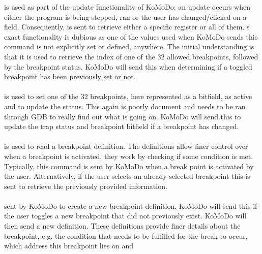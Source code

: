 %
 is used as part of the update functionality of KoMoDo; an update occurs when either the program is being stepped, ran or the user has changed/clicked on a field. Consequently,  is sent to retrieve either a specific register or all of them.
%
%
%
%
s exact functionality is dubious as one of the values used when KoMoDo sends this command is not explicitly set or defined, anywhere. The initial understanding is that it is used to retrieve the index of one of the 32 allowed breakpoints, followed by the breakpoint status. KoMoDo will send this when determining if a toggled breakpoint has been previously set or not.\\\\
%
 is used to set one of the 32 breakpoints, here represented as a bitfield, as active and to update the status. This again is poorly document and needs to be ran through GDB to really find out what is going on. KoMoDo will send this to update the trap status and breakpoint bitfield if a breakpoint has changed.\\\\
%
 is used to read a breakpoint definition. The definitions allow finer control over when a breakpoint is activated, they work by checking if some condition is met. Typically, this command is sent by KoMoDo when a break point is activated by the user. Alternatively, if the user selects an already selected breakpoint this is sent to retrieve the previously provided information.\\\\
%
 sent by KoMoDo to create a new breakpoint definition. KoMoDo will send this if the user toggles a new breakpoint that did not previously exist. KoMoDo will then send a new definition. These definitions  provide finer details about the breakpoint, e.g. the condition that needs to be fulfilled for the break to occur, which address this breakpoint lies on and 
